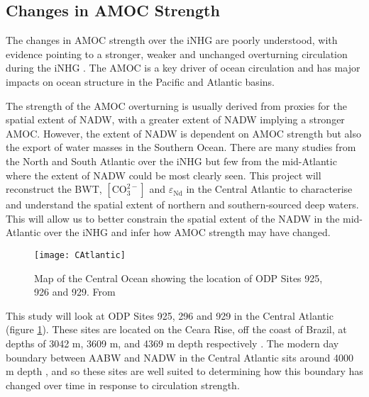 \subsection{Changes in AMOC Strength}

The changes in AMOC strength over the iNHG are poorly understood, with evidence pointing to a stronger, weaker and unchanged overturning circulation during the iNHG \citep{raymoResponseDeepOcean1992, hayashiLatestPlioceneNorthern2020, langIncursionsSouthernsourcedWater2016}. The AMOC is a key driver of ocean circulation \citep{talleyChapterAtlanticOcean2011} and has major impacts on ocean structure in the Pacific and Atlantic basins.

The strength of the AMOC overturning is usually derived from proxies for the spatial extent of NADW, with a greater extent of NADW implying a stronger AMOC. However, the extent of NADW is dependent on AMOC strength but also the export of water masses in the Southern Ocean. There are many studies from the North \citep{hayashiLatestPlioceneNorthern2020, langIncursionsSouthernsourcedWater2016} and South \citep{hodellHighResolutionStableIsotopic1992,raymoResponseDeepOcean1992} Atlantic over the iNHG but few from the mid-Atlantic where the extent of NADW could be most clearly seen. This project will reconstruct the BWT, $\left[ \text{CO}_3^{2-}\right]$ and $\varepsilon_\text{Nd}$ in the Central Atlantic to characterise and understand the spatial extent of northern and southern-sourced deep waters. This will allow us to better constrain the spatial extent of the NADW in the mid-Atlantic over the iNHG and infer how AMOC strength may have changed.

\begin{figure}[h]
    \centering
    \texttt{[image: CAtlantic]}
    \caption{Map of the Central Ocean showing the location of ODP Sites 925, 926 and 929. From \citet{gebcobathymetriccompilationgroup2021GEBCO2021Grid2021}}
    \label{fig:CAtlantic}
\end{figure}

This study will look at ODP Sites 925, 296 and 929 in the Central Atlantic (figure \ref{fig:CAtlantic}). These sites are located on the Ceara Rise, off the coast of Brazil, at depths of 3042 m, 3609 m, and 4369 m depth respectively \citep{curryProceedingsOceanDrilling1995}. The modern day boundary between AABW and NADW in the Central Atlantic sits around 4000 m depth \citep{curryProceedingsOceanDrilling1995}, and so these sites are well suited to determining how this boundary has changed over time in response to circulation strength.

